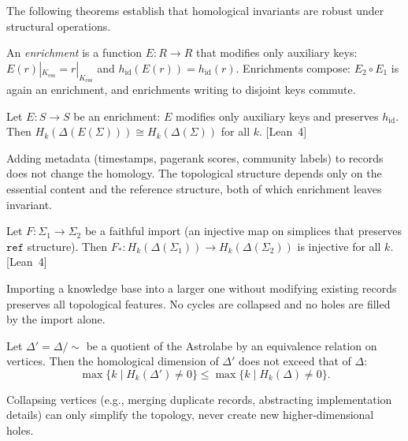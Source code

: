 The following theorems establish that homological invariants are robust under structural operations.

\begin{definition}[Enrichment]
\label{def:enrichment}
An \emph{enrichment} is a function $E : R \to R$ that modifies only auxiliary keys: $E(r)|_{K_{\mathrm{ess}}} = r|_{K_{\mathrm{ess}}}$ and $h_{\mathrm{id}}(E(r)) = h_{\mathrm{id}}(r)$. Enrichments compose: $E_2 \circ E_1$ is again an enrichment, and enrichments writing to disjoint keys commute.
\end{definition}

\begin{theorem}
\label{thm:enrichment-invariance}
Let $E : S \to S$ be an enrichment: $E$ modifies only auxiliary keys and preserves $h_{\mathrm{id}}$. Then $H_k(\Delta(E(\Sigma))) \cong H_k(\Delta(\Sigma))$ for all $k$. \textup{[Lean~4]}
\end{theorem}

Adding metadata (timestamps, pagerank scores, community labels) to records does not change the homology. The topological structure depends only on the essential content and the reference structure, both of which enrichment leaves invariant.

\begin{theorem}
\label{thm:faithful-import}
Let $F : \Sigma_1 \to \Sigma_2$ be a faithful import (an injective map on simplices that preserves $\texttt{ref}$ structure). Then $F_* : H_k(\Delta(\Sigma_1)) \to H_k(\Delta(\Sigma_2))$ is injective for all $k$. \textup{[Lean~4]}
\end{theorem}

Importing a knowledge base into a larger one without modifying existing records preserves all topological features. No cycles are collapsed and no holes are filled by the import alone.

\begin{theorem}
\label{thm:quotient-dimension}
Let $\Delta' = \Delta / {\sim}$ be a quotient of the Astrolabe by an equivalence relation on vertices. Then the homological dimension of $\Delta'$ does not exceed that of $\Delta$:
\[
\max\{ k \mid H_k(\Delta') \neq 0 \} \leq \max\{ k \mid H_k(\Delta) \neq 0 \}.
\]
\end{theorem}

Collapsing vertices (e.g., merging duplicate records, abstracting implementation details) can only simplify the topology, never create new higher-dimensional holes.

